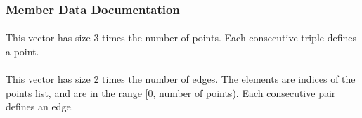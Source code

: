 \subsubsection{Member Data Documentation}
\hypertarget{classew_1_1Curve3_aca6992a3b3b6fb8d27824437c55d8c35}{
\paragraph[{points}]{}\hfill}
\label{classew_1_1Curve3_aca6992a3b3b6fb8d27824437c55d8c35}
This vector has size 3 times the number of points. Each consecutive triple defines a point. \hypertarget{classew_1_1Curve3_a5fb191b14f5b7dceb04eeebf9e7171d3}{
\paragraph[{edges}]{}\hfill}
\label{classew_1_1Curve3_a5fb191b14f5b7dceb04eeebf9e7171d3}
This vector has size 2 times the number of edges. The elements are indices of the points list, and are in the range \mbox{[}0, number of points). Each consecutive pair defines an edge. 